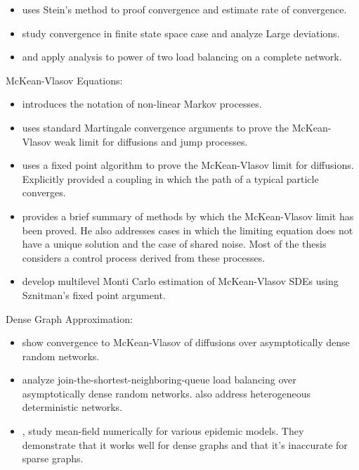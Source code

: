 \documentclass[12pt]{article}
\begin{document}
\begin{itemize}
\item \cite{Yin15} uses Stein's method to proof convergence and estimate rate of convergence.

\item \cite{DupRamWu16} study convergence in finite state space case and analyze Large deviations.

\item \cite{VveDobKar96} and \cite{Mit01} apply analysis to power of two load balancing on a complete network. 
\end{itemize}

McKean-Vlasov Equations:

\begin{itemize}
\item \cite{Mck66} introduces the notation of non-linear Markov processes.

\item \cite{Oel84} uses standard Martingale convergence arguments to prove the McKean-Vlasov weak limit for diffusions and jump processes.

\item \cite{Szn91} uses a fixed point algorithm to prove the McKean-Vlasov limit for diffusions. Explicitly provided a coupling in which the path of a typical particle converges.

\item \cite{Lac15} provides a brief summary of methods by which the McKean-Vlasov limit has been proved. He also addresses cases in which the limiting equation does not have a unique solution and the case of shared noise. Most of the thesis considers a control process derived from these processes.

\item \cite{SzpTanTse17} develop multilevel Monti Carlo estimation of McKean-Vlasov SDEs using Sznitman's fixed point argument.
\end{itemize}

Dense Graph Approximation:

\begin{itemize}
\item \cite{BhaBudWu17} show convergence to McKean-Vlasov of diffusions over asymptotically dense random networks.

\item \cite{MukBorLee17} analyze join-the-shortest-neighboring-queue load balancing over asymptotically dense random networks. \cite{BudMukWu17} also address heterogeneous deterministic networks.

\item \cite{MieBov15},\cite{GreKisKao06} study mean-field numerically for various epidemic models. They demonstrate that it works well for dense graphs and that it's inaccurate for sparse graphs.
\end{itemize}
\end{document}
